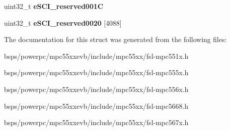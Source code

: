 \begin{DoxyCompactItemize}
\begin{tabbing}
\end{tabbing}\item 
\mbox{\label{structESCI__tag_abc765b6afd019370112bb49200afd6f6}} 
uint32\+\_\+t {\bfseries e\+S\+C\+I\+\_\+reserved001C}
\item 
\mbox{\label{structESCI__tag_a478013d8c3d1b0f3d179d953ba520fae}} 
uint32\+\_\+t {\bfseries e\+S\+C\+I\+\_\+reserved0020} \mbox{[}4088\mbox{]}
\end{DoxyCompactItemize}


The documentation for this struct was generated from the following files\+:\begin{DoxyCompactItemize}
\item 
bsps/powerpc/mpc55xxevb/include/mpc55xx/fsl-\/mpc551x.\+h\item 
bsps/powerpc/mpc55xxevb/include/mpc55xx/fsl-\/mpc555x.\+h\item 
bsps/powerpc/mpc55xxevb/include/mpc55xx/fsl-\/mpc556x.\+h\item 
bsps/powerpc/mpc55xxevb/include/mpc55xx/fsl-\/mpc5668.\+h\item 
bsps/powerpc/mpc55xxevb/include/mpc55xx/fsl-\/mpc567x.\+h\end{DoxyCompactItemize}

